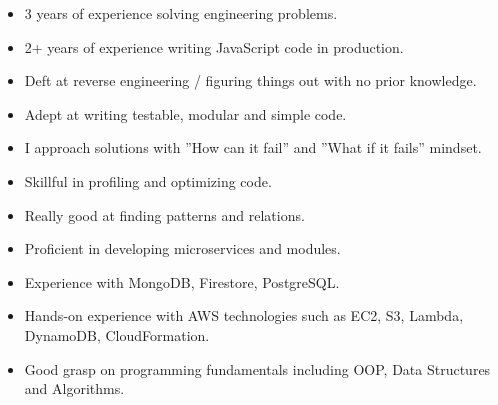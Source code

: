 


\smallskip
\begin{itemize}
\item 3 years of experience solving engineering problems.
\smallskip
\item 2+ years of experience writing JavaScript code in production.
\smallskip
\item Deft at reverse engineering / figuring things out with no prior knowledge.
\smallskip
\item Adept at writing testable, modular and simple code.
\smallskip
\item I approach solutions with ”How can it fail” and ”What if it fails” mindset.
\smallskip
\item Skillful in profiling and optimizing code.
\smallskip
\item Really good at finding patterns and relations.
\smallskip
\item Proficient in developing microservices and modules.
\smallskip
\item Experience with MongoDB, Firestore, PostgreSQL.
\smallskip
\item Hands-on experience with AWS technologies such as EC2, S3, Lambda, DynamoDB, CloudFormation.
\smallskip
\item Good grasp on programming fundamentals including OOP, Data Structures and Algorithms.
\end{itemize}
